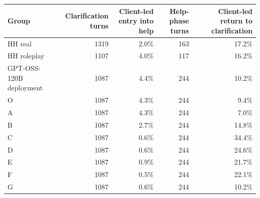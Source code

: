 \begin{tabular}{lrrrr}
\toprule
Group & Clarification turns & Client-led entry into help & Help-phase turns & Client-led return to clarification \\
\midrule
HH real & 1319 & 2.0\% & 163 & 17.2\% \\
HH roleplay & 1107 & 4.0\% & 117 & 16.2\% \\
GPT-OSS-120B deployment & 1087 & 4.4\% & 244 & 10.2\% \\
O & 1087 & 4.3\% & 244 & 9.4\% \\
A & 1087 & 4.3\% & 244 & 7.0\% \\
B & 1087 & 2.7\% & 244 & 14.8\% \\
C & 1087 & 0.6\% & 244 & 34.4\% \\
D & 1087 & 0.6\% & 244 & 24.6\% \\
E & 1087 & 0.9\% & 244 & 21.7\% \\
F & 1087 & 0.5\% & 244 & 22.1\% \\
G & 1087 & 0.6\% & 244 & 10.2\% \\
\bottomrule
\end{tabular}
